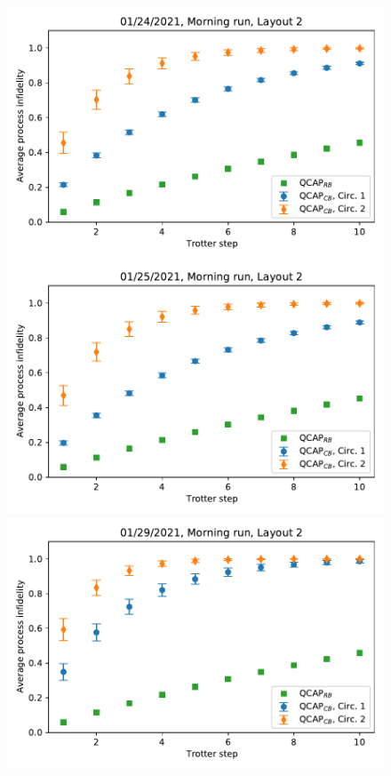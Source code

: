 \begin{figure}[htpb]
    \includegraphics[scale=0.36]{QCAP_CB_RB_Data_01_24_2021_Layout_2C1_C2_Morning.pdf}
    \includegraphics[scale=0.36]{QCAP_CB_RB_Data_01_25_2021_Layout_2C1_C2_Morning.pdf}
    \includegraphics[scale=0.36]{QCAP_CB_RB_Data_01_29_2021_Layout_2C1_C2_Morning.pdf}

\end{figure}
